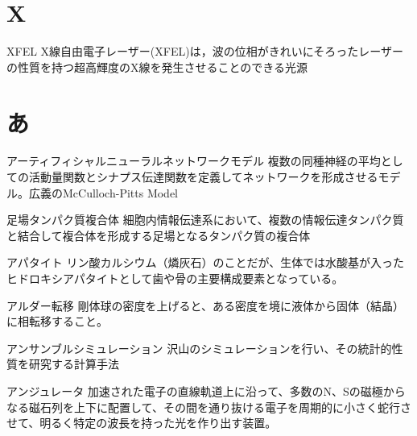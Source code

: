 \begin{用語集}
\section{X}
\item{XFEL}{}
{X線自由電子レーザー(XFEL)は，波の位相がきれいにそろったレーザーの性質を持つ超高輝度のX線を発生させることのできる光源}
\section{あ}
\item{アーティフィシャルニューラルネットワークモデル}{}
{複数の同種神経の平均としての活動量関数とシナプス伝達関数を定義してネットワークを形成させるモデル。広義のMcCulloch-Pitts Model }
\item{足場タンパク質複合体}{}
{細胞内情報伝達系において、複数の情報伝達タンパク質と結合して複合体を形成する足場となるタンパク質の複合体}
\item{アパタイト}{}
{リン酸カルシウム（燐灰石）のことだが、生体では水酸基が入ったヒドロキシアパタイトとして歯や骨の主要構成要素となっている。}
\item{アルダー転移}{}
{剛体球の密度を上げると、ある密度を境に液体から固体（結晶）に相転移すること。}
\item{アンサンブルシミュレーション}{}
{沢山のシミュレーションを行い、その統計的性質を研究する計算手法}
\item{アンジュレータ}{}
{加速された電子の直線軌道上に沿って、多数のN、Sの磁極からなる磁石列を上下に配置して、その間を通り抜ける電子を周期的に小さく蛇行させて、明るく特定の波長を持った光を作り出す装置。}

\end{用語集}
